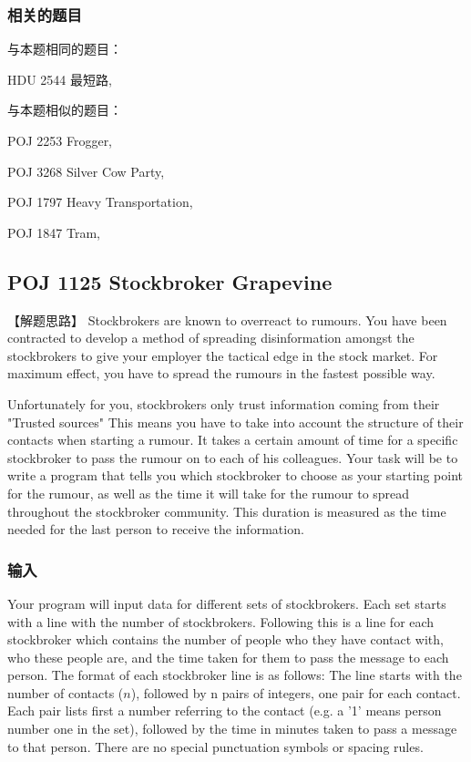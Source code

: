 \subsubsection{相关的题目}
与本题相同的题目：
\begindot
\item HDU 2544 最短路, 
\myenddot

与本题相似的题目：
\begindot
\item POJ 2253 Frogger, 
\item POJ 3268 Silver Cow Party, 
\item POJ 1797 Heavy Transportation, 
\item POJ 1847 Tram, 
\myenddot


\subsection{POJ 1125 Stockbroker Grapevine}
【解题思路】
Stockbrokers are known to overreact to rumours. You have been contracted to develop a method of spreading disinformation amongst the stockbrokers to give your employer the tactical edge in the stock market. For maximum effect, you have to spread the rumours in the fastest possible way. 

Unfortunately for you, stockbrokers only trust information coming from their "Trusted sources" This means you have to take into account the structure of their contacts when starting a rumour. It takes a certain amount of time for a specific stockbroker to pass the rumour on to each of his colleagues. Your task will be to write a program that tells you which stockbroker to choose as your starting point for the rumour, as well as the time it will take for the rumour to spread throughout the stockbroker community. This duration is measured as the time needed for the last person to receive the information.

\subsubsection{输入}
Your program will input data for different sets of stockbrokers. Each set starts with a line with the number of stockbrokers. Following this is a line for each stockbroker which contains the number of people who they have contact with, who these people are, and the time taken for them to pass the message to each person. The format of each stockbroker line is as follows: The line starts with the number of contacts ($n$), followed by n pairs of integers, one pair for each contact. Each pair lists first a number referring to the contact (e.g. a '1' means person number one in the set), followed by the time in minutes taken to pass a message to that person. There are no special punctuation symbols or spacing rules. 


